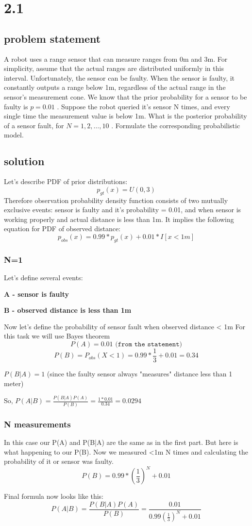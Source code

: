 \documentclass{article}
\begin{document}
\section*{2.1}

\subsection*{problem statement}
A robot uses a range sensor that can measure ranges from 0m and 3m. For simplicity, assume that the actual ranges are distributed uniformly in this interval. Unfortunately, the sensor can be faulty. When the sensor is faulty, it constantly outputs a range below 1m, regardless of the actual range in the sensor's measurement cone. We know that the prior probability for a sensor to be faulty is  $p=0.01$ .
Suppose the robot queried it's sensor N times, and every single time the measurement value is below 1m. What is the posterior probability of a sensor fault, for  $N=1,2,\dots,10$ . Formulate the corresponding probabilistic model.
\subsection*{solution}
Let's describe PDF of prior distributions:
$$ p_{gt}(x) = U(0,3) $$
Therefore observation probability density function consists of two mutually exclusive events: sensor is faulty and it's probability = 0.01, and when sensor is working properly and actual distance is less than 1m. 
It implies the following equation for PDF of observed distance:
$$ p_{obs}(x) = 0.99*p_{gt}(x) + 0.01 * I[x<1m]$$

\subsubsection*{N=1}

Let's define several events:


\textbf{A - sensor is faulty}


\textbf{B - observed distance is less than 1m}


Now let's define the probability of sensor fault when observed distance < 1m
For this task we will use Bayes theorem
$$ P(A) = 0.01 \texttt{ (from the statement)}$$
$$ P(B) = P_{obs}(X<1) = 0.99 * \frac{1}{3} + 0.01 = 0.34 $$


$P(B|A) = 1$ (since the faulty sensor always "measures" distance less than 1 meter)


So, $P(A|B)=\frac{P(B|A)P(A)}{P(B)} = \frac{1 * 0.01}{0.34} = 0.0294$


\subsubsection*{N measurements}

In this case our P(A) and P(B|A) are the same as in the first part. But here is what happening to our P(B). Now we measured <1m N times and calculating the probability of it or sensor was faulty. 
$$ P(B) = 0.99 * (\frac{1}{3})^{N} + 0.01 $$

Final formula now looks like this:
$$P(A|B)=\frac{P(B|A)P(A)}{P(B)} = \frac{0.01}{0.99 (\frac{1}{3})^{N} + 0.01}$$
\end{document}
